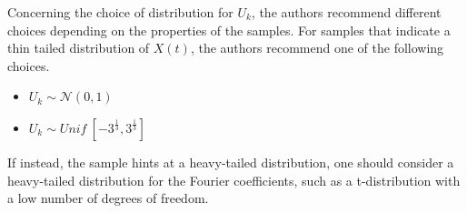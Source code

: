 \documentclass[12pt, a4paper]{article}
\theoremstyle{MAstyle} \newtheorem{assumption}{Assumption}[section]
\theoremstyle{MAstyle} \newtheorem{definition}{Definition}[section]
\theoremstyle{MAstyle} \newtheorem{theorem}{Theorem}[section]
\begin{document}
			Concerning the choice of distribution for $U_k$, the authors recommend different choices depending on the properties of the samples. For samples that indicate a thin tailed distribution of $X(t)$, the authors recommend one of the following choices.
			\begin{multicols}{2}
				\begin{itemize}
					\item $U_k \sim \mathcal{N}(0,1)$
					\item $U_k \sim \textit{Unif}\ [-3^{\frac{1}{3}}, 3^{\frac{1}{3}}]$
				\end{itemize}
			\end{multicols}
			If instead, the sample hints at a heavy-tailed distribution, one should consider a heavy-tailed distribution for the Fourier coefficients, such as a t-distribution with a low number of degrees of freedom.
			
			
%			
			
\end{document}
